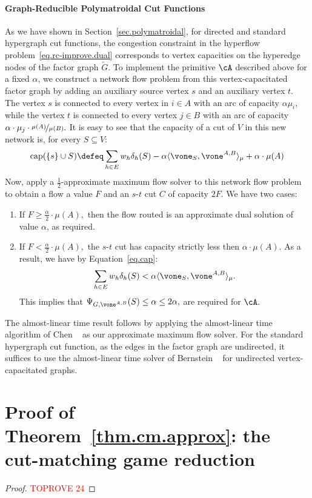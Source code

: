 \documentclass[letterpaper]{article}
\begin{document}
\paragraph{Graph-Reducible Polymatroidal Cut Functions}
As we have shown in Section~\ref{sec.polymatroidal},
for directed and standard hypergraph cut functions, the congestion constraint in the hyperflow problem~\ref{eq.rc-improve.dual} corresponds to vertex capacities on the hyperedge nodes of the factor graph $\tilde{G}.$ To implement the primitive $\cA$ described above for a fixed $\alpha$, we construct a network flow problem from this vertex-capacitated factor graph by adding an auxiliary source vertex $s$ and an auxiliary vertex $t$. The vertex $s$ is connected to every vertex in $i \in A$ with an arc of capacity $\alpha \mu_i$, while the vertex $t$ is connected to every vertex $j \in B$ with an arc of capacity $\alpha \cdot \mu_j \cdot \nicefrac{\mu(A)}{\mu(B)}.$ It is easy to see that the capacity of a cut of $V$ in this new network is, for every $S \subseteq V$:
\begin{equation}
\label{eq.cap}
\operatorname{cap}(\{s\} \cup S) \defeq \sum_{h \in E} w_h \delta_h(S) - \alpha \langle \vone_S, \vone^{A,B} \rangle_{\mu} + \alpha \cdot \mu(A)
\end{equation}
Now, apply a $\frac{1}{2}$-approximate maximum flow solver to this network flow problem to obtain a flow a value $F$ and an $s$-$t$ cut $C$ of capacity $2F.$ We have two cases:
\begin{enumerate}
    \item If $F \geq \frac{\alpha}{2} \cdot \mu(A),$ then the flow routed  is an approximate dual solution of value $\alpha$, as required.
    \item If $F <\frac{\alpha}{2} \cdot \mu(A),$ the $s$-$t$ cut has capacity strictly less then $\alpha \cdot \mu(A).$ As a result, we have by Equation~\ref{eq.cap}:
    $$
   \sum_{h \in E} w_h \delta_h(S) < \alpha \langle \vone_S, \vone^{A,B} \rangle_{\mu}.
    $$
    This implies that $\Psi_{G,\vone^{A,B}}(S) \leq \alpha \leq 2\alpha,$ are required for $\cA.$
\end{enumerate}
The almost-linear time result follows by applying the almost-linear time algorithm of Chen \etal~\cite{chenMaximumFlowMinimumCost2022} as our approximate maximum flow solver. For the standard hypergraph cut function, as the edges in the factor graph are undirected, it suffices to use the almost-linear time solver of Bernstein \etal~\cite{bernstein2022deterministic} for undirected vertex-capacitated graphs.
 \section{Proof of Theorem~\ref{thm.cm.approx}: the cut-matching game reduction}
\label{sec.cut-strategy.reduction-proof}

\cmapprox*
\begin{proof}\textcolor{red}{TOPROVE 24}\end{proof}
 
\end{document}
